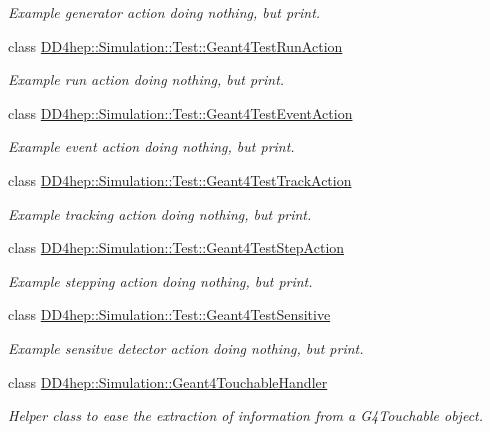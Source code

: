 \begin{DoxyCompactItemize}
\begin{DoxyCompactList}\small\item\em Example generator action doing nothing, but print. \end{DoxyCompactList}\item 
class \hyperlink{class_d_d4hep_1_1_simulation_1_1_test_1_1_geant4_test_run_action}{D\+D4hep\+::\+Simulation\+::\+Test\+::\+Geant4\+Test\+Run\+Action}
\begin{DoxyCompactList}\small\item\em Example run action doing nothing, but print. \end{DoxyCompactList}\item 
class \hyperlink{class_d_d4hep_1_1_simulation_1_1_test_1_1_geant4_test_event_action}{D\+D4hep\+::\+Simulation\+::\+Test\+::\+Geant4\+Test\+Event\+Action}
\begin{DoxyCompactList}\small\item\em Example event action doing nothing, but print. \end{DoxyCompactList}\item 
class \hyperlink{class_d_d4hep_1_1_simulation_1_1_test_1_1_geant4_test_track_action}{D\+D4hep\+::\+Simulation\+::\+Test\+::\+Geant4\+Test\+Track\+Action}
\begin{DoxyCompactList}\small\item\em Example tracking action doing nothing, but print. \end{DoxyCompactList}\item 
class \hyperlink{class_d_d4hep_1_1_simulation_1_1_test_1_1_geant4_test_step_action}{D\+D4hep\+::\+Simulation\+::\+Test\+::\+Geant4\+Test\+Step\+Action}
\begin{DoxyCompactList}\small\item\em Example stepping action doing nothing, but print. \end{DoxyCompactList}\item 
class \hyperlink{class_d_d4hep_1_1_simulation_1_1_test_1_1_geant4_test_sensitive}{D\+D4hep\+::\+Simulation\+::\+Test\+::\+Geant4\+Test\+Sensitive}
\begin{DoxyCompactList}\small\item\em Example sensitve detector action doing nothing, but print. \end{DoxyCompactList}\item 
class \hyperlink{class_d_d4hep_1_1_simulation_1_1_geant4_touchable_handler}{D\+D4hep\+::\+Simulation\+::\+Geant4\+Touchable\+Handler}
\begin{DoxyCompactList}\small\item\em Helper class to ease the extraction of information from a G4\+Touchable object. \end{DoxyCompactList}\item 

\end{DoxyCompactItemize}
